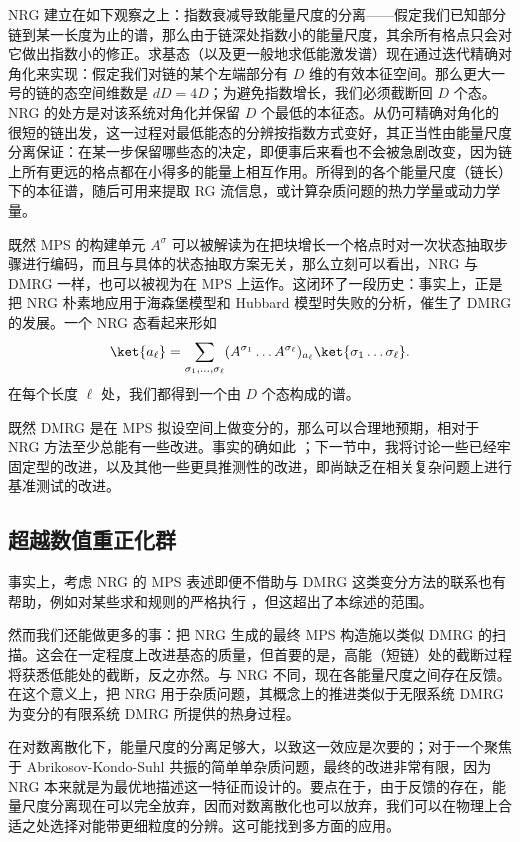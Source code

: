 NRG 建立在如下观察之上：指数衰减导致能量尺度的分离——假定我们已知部分链到某一长度为止的谱，那么由于链深处指数小的能量尺度，其余所有格点只会对它做出指数小的修正。求基态（以及更一般地求低能激发谱）现在通过迭代精确对角化来实现：假定我们对链的某个左端部分有 $D$ 维的有效本征空间。那么更大一号的链的态空间维数是 $dD=4D$；为避免指数增长，我们必须截断回 $D$ 个态。NRG 的处方是对该系统对角化并保留 $D$ 个最低的本征态。从仍可精确对角化的很短的链出发，这一过程对最低能态的分辨按指数方式变好，其正当性由能量尺度分离保证：在某一步保留哪些态的决定，即便事后来看也不会被急剧改变，因为链上所有更远的格点都在小得多的能量上相互作用。所得到的各个能量尺度（链长）下的本征谱，随后可用来提取 RG 流信息，或计算杂质问题的热力学量或动力学量。

既然 MPS 的构建单元 $A^\sigma$ 可以被解读为在把块增长一个格点时对一次状态抽取步骤进行编码，而且与具体的状态抽取方案无关，那么立刻可以看出，NRG 与 DMRG 一样，也可以被视为在 MPS 上运作\cite{Weichselbaum09}。这闭环了一段历史：事实上，正是把 NRG 朴素地应用于海森堡模型和 Hubbard 模型时失败的分析，催生了 DMRG 的发展。一个 NRG 态看起来形如
\begin{equation}
\ket{a_\ell} = \sum_{\sigma_1,\ldots,\sigma_\ell} (A^{\sigma_1} \ldots  A^{\sigma_\ell})_{a_\ell} \ket{\sigma_1\ldots\sigma_\ell}.
\end{equation}
在每个长度 $\ell$ 处，我们都得到一个由 $D$ 个态构成的谱。

既然 DMRG 是在 MPS 拟设空间上做变分的，那么可以合理地预期，相对于 NRG 方法至少总能有一些改进。事实的确如此 \cite{Weichselbaum09}；下一节中，我将讨论一些已经牢固定型的改进，以及其他一些更具推测性的改进，即尚缺乏在相关复杂问题上进行基准测试的改进。

\subsection{超越数值重正化群}
事实上，考虑 NRG 的 MPS 表述即便不借助与 DMRG 这类变分方法的联系也有帮助，例如对某些求和规则的严格执行 \cite{Weichselbaum07,Peters06}，但这超出了本综述的范围。

然而我们还能做更多的事：把 NRG 生成的最终 MPS 构造施以类似 DMRG 的扫描。这会在一定程度上改进基态的质量，但首要的是，高能（短链）处的截断过程将获悉低能处的截断，反之亦然。与 NRG 不同，现在各能量尺度之间存在反馈。在这个意义上，把 NRG 用于杂质问题，其概念上的推进类似于无限系统 DMRG 为变分的有限系统 DMRG 所提供的热身过程。

在对数离散化下，能量尺度的分离足够大，以致这一效应是次要的；对于一个聚焦于 Abrikosov-Kondo-Suhl 共振的简单单杂质问题，最终的改进非常有限，因为 NRG 本来就是为最优地描述这一特征而设计的。要点在于，由于反馈的存在，能量尺度分离现在可以完全放弃，因而对数离散化也可以放弃，我们可以在物理上合适之处选择对能带更细粒度的分辨。这可能找到多方面的应用。

